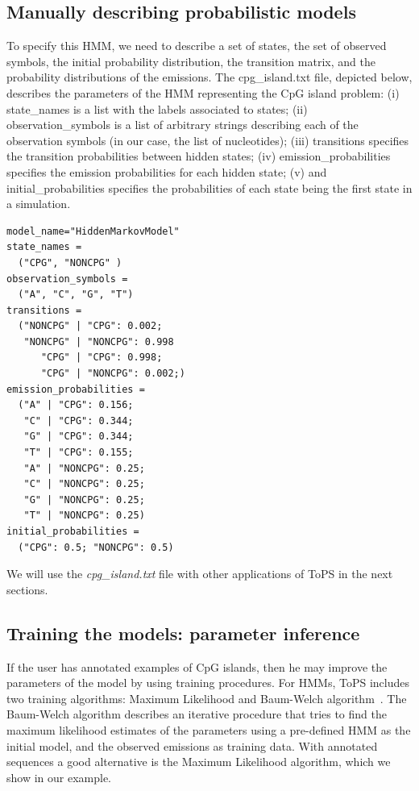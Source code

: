 \documentclass[10pt]{article}
\begin{document}
\subsection*{Manually describing probabilistic models}
\label{sec:describing}

To specify this HMM, we need to describe  a set of states, the set of observed symbols, the initial probability distribution, the transition matrix, and the  probability distributions of the emissions.  The cpg\_island.txt file, depicted below, describes the parameters of  the HMM representing the CpG island problem: (i) state\_names is a list with the labels associated to states; (ii) observation\_symbols is a list of arbitrary strings describing each of the observation symbols (in our case, the list of nucleotides); (iii) transitions specifies the transition probabilities between hidden states; (iv) emission\_probabilities specifies the emission probabilities for each hidden state; (v) and initial\_probabilities specifies the probabilities of each state being the first state in a simulation.


\vspace{1em}
\begin{Verbatim}[frame=single, label=cpg\_island.txt]
model_name="HiddenMarkovModel"
state_names =
  ("CPG", "NONCPG" )
observation_symbols =
  ("A", "C", "G", "T")
transitions =
  ("NONCPG" | "CPG": 0.002;
   "NONCPG" | "NONCPG": 0.998
      "CPG" | "CPG": 0.998;
      "CPG" | "NONCPG": 0.002;)
emission_probabilities =
  ("A" | "CPG": 0.156;
   "C" | "CPG": 0.344;
   "G" | "CPG": 0.344;
   "T" | "CPG": 0.155;
   "A" | "NONCPG": 0.25;
   "C" | "NONCPG": 0.25;
   "G" | "NONCPG": 0.25;
   "T" | "NONCPG": 0.25)
initial_probabilities =
  ("CPG": 0.5; "NONCPG": 0.5)
\end{Verbatim}
\vspace{1em}

We will use  the \textit{cpg\_island.txt} file  with other applications of  ToPS  in the next sections.


\subsection*{Training the models: parameter inference}


If the user has annotated examples of CpG islands,  then he may  improve the parameters of the model by using training procedures. For HMMs, ToPS includes two training  algorithms: Maximum Likelihood and   Baum-Welch algorithm~\cite{Rabiner1989}. The Baum-Welch algorithm  describes an iterative procedure  that tries to find the maximum likelihood estimates of the parameters using a pre-defined HMM as the initial model, and the observed emissions as  training data.  With annotated sequences a good alternative is the Maximum Likelihood algorithm, which we show in our example.
\end{document}
